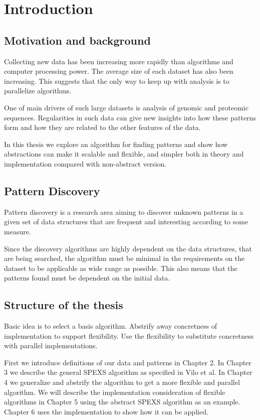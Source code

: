 \chapter{Introduction}

\section{Motivation and background}

Collecting new data has been increasing more rapidly than algorithms and
computer processing power. The average size of each dataset has also
been increasing. This suggests that the only way to keep up with
analysis is to parallelize algorithms.

One of main drivers of such large datasets is analysis
of genomic and proteomic sequences. Regularities in such data can 
give new insights into how these patterns form and how 
they are related to the other features of the data.


In this thesis we explore an algorithm for finding patterns and show how
abstractions can make it scalable and flexible, and simpler both in 
theory and implementation compared with non-abstract version.

\section{Pattern Discovery}

Pattern discovery is a research area aiming to discover unknown patterns
in a given set of data structures that are frequent and interesting according 
to some measure.

Since the discovery algorithms are highly dependent on the
data structures, that are being searched, the algorithm must be minimal
in the requirements on the dataset to be applicable as wide range as possible.
This also means that the patterns found must be dependent on the initial data.

\section{Structure of the thesis}

Basic idea is to select a basis algorithm. Abstrify away concretness of 
implementation to support flexibility. Use the flexibility to substitute 
concretness with parallel implementations.


First we introduce definitions of our data and patterns in Chapter 2. In
Chapter 3 we describe the general SPEXS algorithm as specified in Vilo et al.
In Chapter 4 we generalize and abstrify the algorithm to get a more flexible
and parallel algorithm. We will describe the implementation consideration of
flexible algorithms in Chapter 5 using the abstract SPEXS algorithm as an
example. Chapter 6 uses the implementation to show how it can be applied.